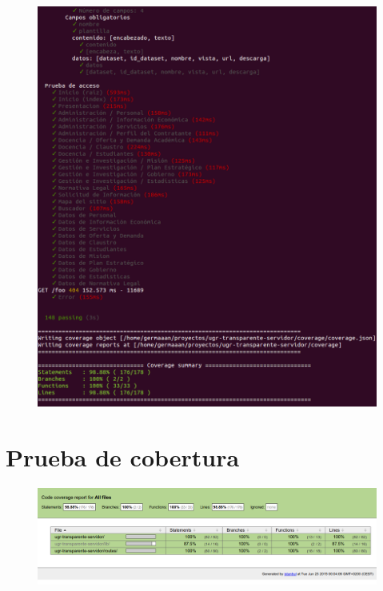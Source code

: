 \begin{figure}[!ht]
	\begin{center}
		\includegraphics[width=1\textwidth]{../images/tests_unitarios_02.png}
		\caption{}
		\label{fig:tests_unitarios_02}
	\end{center}
\end{figure}

\section{Prueba de cobertura}

\begin{figure}[!ht]
	\begin{center}
		\includegraphics[width=1\textwidth]{../images/test_cobertura_01.png}
		\caption{}
		\label{fig:test_cobertura_01}
	\end{center}
\end{figure}

